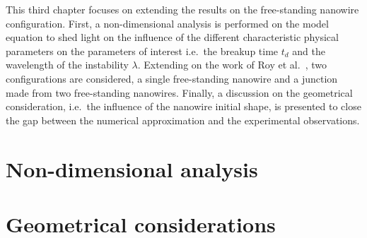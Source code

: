 This third chapter focuses on extending the results on the free-standing nanowire configuration. First, a non-dimensional analysis is performed on the model equation to shed light on the influence of the different characteristic physical parameters on the parameters of interest i.e.\ the breakup time $t_d$ and the wavelength of the instability $\lambda$. Extending on the work of Roy et al.\ \cite{RoyVarmaGururajan2021}, two configurations are considered, a single free-standing nanowire and a junction made from two free-standing nanowires. Finally, a discussion on the geometrical consideration, i.e.\ the influence of the nanowire initial shape, is presented to close the gap between the numerical approximation and the experimental observations.
\section{Non-dimensional analysis}
\section{Geometrical considerations}
